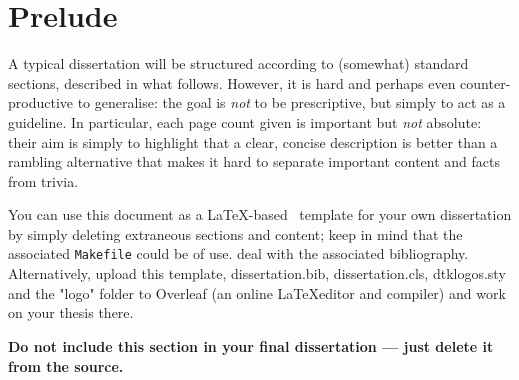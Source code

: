 \documentclass[oneside,%
                    author={Malak Hajji},
                    degree={BSc},
                    title={Designing An Accessible Computational Toolkit For Students},
                  subtitle={With Mixed Visual Abilities}]{dissertation}
\begin{document}


\section*{Prelude}
\thispagestyle{empty}

A typical dissertation will be structured according to (somewhat) standard 
sections, described in what follows.  However, it is hard and perhaps even 
counter-productive to generalise: the goal is {\em not} to be prescriptive, 
but simply to act as a guideline.  In particular, each page count given is
important but {\em not} absolute: their aim is simply to highlight that a 
clear, concise description is better than a rambling alternative that makes
it hard to separate important content and facts from trivia.

You can use this document as a \LaTeX-based~\cite{latexbook1,latexbook2} 
template for your own dissertation by simply deleting extraneous sections
and content; keep in mind that the associated {\tt Makefile} could be of
use. %
deal with the associated bibliography. 
Alternatively, upload this template, dissertation.bib, dissertation.cls, 
dtklogos.sty and the "logo" folder to Overleaf (an online \LaTeX editor and compiler) and work on your thesis there.

\textbf{Do not include this section in your final dissertation --- just delete it from the source.}



\maketitle

\end{document}
